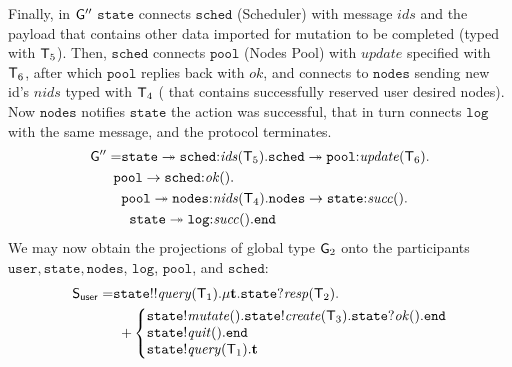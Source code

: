 Finally, in ${\sf G}''$ $\mathtt{state}$ connects $\mathtt{sched}$ (Scheduler) with message $\mathit{ids}$ and the payload that contains other data imported for mutation to be completed (typed with ${\mathsf T}_5$). 
Then, $\mathtt{sched}$ connects $\mathtt{pool}$ (Nodes Pool) with $\mathit{update}$ specified with ${\mathsf T}_6$, after which $\mathtt{pool}$ replies back with $\mathit{ok}$, and connects to $\mathtt{nodes}$ sending new id's $\mathit{nids}$ typed with ${\mathsf T}_4$ ( that contains successfully reserved user desired nodes). Now $\mathtt{nodes}$ notifies $\mathtt{state}$ the action was successful, that in turn connects $\mathtt{log}$ with the same message, and the protocol terminates.
\begin{align*}
\G'' = &
\mathtt{state}\twoheadrightarrow\mathtt{sched}{:}\mathit{ids}(\T_5).
\mathtt{sched}\twoheadrightarrow\mathtt{pool}{:}\mathit{update}(\T_6). \\
& \hspace{-2mm}
\mathtt{pool}\to\mathtt{sched}{:}\mathit{ok}(). \\
& %
\mathtt{pool}\twoheadrightarrow\mathtt{nodes}{:}\mathit{nids}(\T_4). 
\mathtt{nodes}\to\mathtt{state}{:}\mathit{succ}(). \\
& \hspace{2mm}
\mathtt{state}\twoheadrightarrow \mathtt{log}{:}\mathit{succ}().\tend
\end{align*}
We may now obtain the projections of global type ${\sf G}_2$ onto the participants $\mathtt{user}, \mathtt{state}, \mathtt{nodes}$, $\mathtt{log}$, $\mathtt{pool}$, and $\mathtt{sched}$:
\begin{align*}
\ST_\mathsf{user} = & 
\mathtt{state}{!!}\mathit{query}(\T_1).\mu \ty. 
\mathtt{state}{?}\mathit{resp}(\T_2).\\
& \hspace{2mm}
{+}
\left\{
\begin{array}{@{}l@{}}
\mathtt{state}{!}\mathit{mutate}().\mathtt{state}{!}\mathit{create}(\T_3).\mathtt{state}{?}\mathit{ok}().\tend\\
\mathtt{state}{!}\mathit{quit}().\tend\\
\mathtt{state}{!}\mathit{query}(\T_1).\ty
\end{array} \right.
\end{align*}
